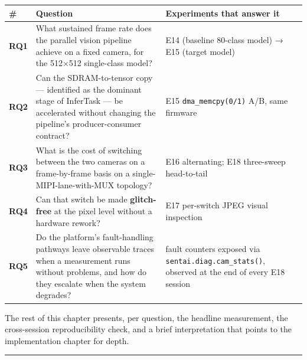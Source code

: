 {\def\LTcaptype{none} %
\begin{longtable}[]{@{}
  >{\raggedright\arraybackslash}p{}
  >{\raggedright\arraybackslash}p{}
  >{\raggedright\arraybackslash}p{}@{}}
\toprule\noalign{}
\begin{minipage}[b]{\linewidth}\raggedright
\#
\end{minipage} & \begin{minipage}[b]{\linewidth}\raggedright
Question
\end{minipage} & \begin{minipage}[b]{\linewidth}\raggedright
Experiments that answer it
\end{minipage} \\
\midrule\noalign{}
\endhead
\bottomrule\noalign{}
\endlastfoot
\textbf{RQ1} & What sustained frame rate does the parallel vision
pipeline achieve on a fixed camera, for the 512×512 single-class model?
& E14 (baseline 80-class model) → E15 (target model) \\
\textbf{RQ2} & Can the SDRAM-to-tensor copy --- identified as the
dominant stage of InferTask --- be accelerated without changing the
pipeline's producer-consumer contract? & E15 \texttt{dma\_memcpy(0/1)}
A/B, same firmware \\
\textbf{RQ3} & What is the cost of switching between the two cameras on
a frame-by-frame basis on a single-MIPI-lane-with-MUX topology? & E16
alternating; E18 three-sweep head-to-tail \\
\textbf{RQ4} & Can that switch be made \textbf{glitch-free} at the pixel
level without a hardware rework? & E17 per-switch JPEG visual
inspection \\
\textbf{RQ5} & Do the platform's fault-handling pathways leave
observable traces when a measurement runs without problems, and how do
they escalate when the system degrades? & fault counters exposed via
\texttt{sentai.diag.cam\_stats()}, observed at the end of every E18
session \\
\end{longtable}
}

The rest of this chapter presents, per question, the headline
measurement, the cross-session reproducibility check, and a brief
interpretation that points to the implementation chapter for depth.

\begin{center}\rule{0.5\linewidth}{0.5pt}\end{center}

